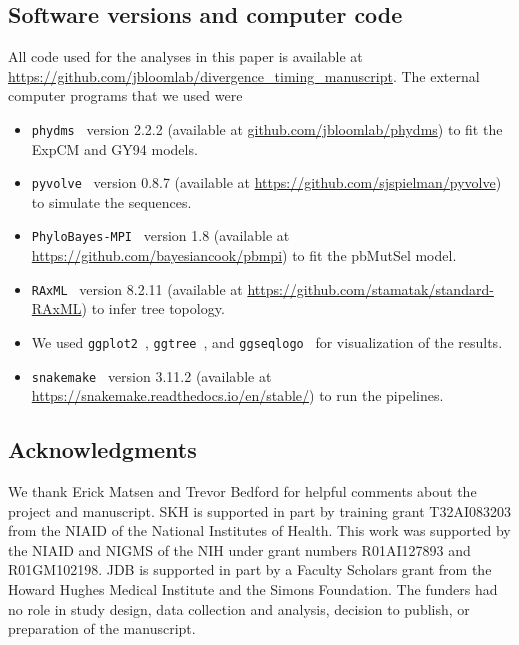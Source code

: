 \documentclass[11pt]{article}
\begin{document}
\subsection*{Software versions and computer code}
All code used for the analyses in this paper is available at \url{https://github.com/jbloomlab/divergence_timing_manuscript}.
The external computer programs that we used were
\begin{itemize} 
\item \texttt{phydms}~\citep{hilton2017phydms} version 2.2.2 (available at \url{github.com/jbloomlab/phydms}) to fit the ExpCM and GY94 models.
\item \texttt{pyvolve}~\citep{spielman2015pyvolve} version 0.8.7 (available at \url{https://github.com/sjspielman/pyvolve}) to simulate the sequences.
\item \texttt{PhyloBayes-MPI}~\citep{rodrigue2014site} version 1.8 (available at \url{https://github.com/bayesiancook/pbmpi}) to fit the pbMutSel model. 
\item \texttt{RAxML}~\citep{stamatakis2006raxml} version 8.2.11 (available at \url{https://github.com/stamatak/standard-RAxML}) to infer tree topology.
\item We used \texttt{ggplot2}~\citep{wickham2016ggplot2}, \texttt{ggtree}~\citep{yu2017ggtree}, and \texttt{ggseqlogo}~\citep{wagih2017ggseqlogo} for visualization of the results.
\item \texttt{snakemake}~\citep{koster2012snakemake} version 3.11.2 (available at \url{https://snakemake.readthedocs.io/en/stable/}) to run the pipelines.
\end{itemize}

\subsection*{Acknowledgments}
We thank Erick Matsen and Trevor Bedford for helpful comments about the project and manuscript.
SKH is supported in part by training grant T32AI083203 from the NIAID of the National Institutes of Health.
This work was supported by the NIAID and NIGMS of the NIH under grant numbers R01AI127893 and R01GM102198. 
JDB is supported in part by a Faculty Scholars grant from the Howard Hughes Medical Institute and the Simons Foundation.
The funders had no role in study design, data collection and analysis, decision to publish, or preparation of the manuscript.

\clearpage 


\end{document}
